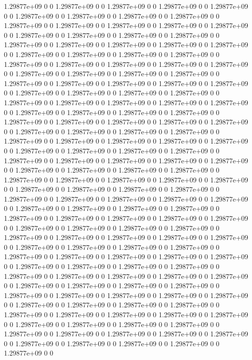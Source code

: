 1.29877e+09 0 0
1.29877e+09 0 0
1.29877e+09 0 0
1.29877e+09 0 0
1.29877e+09 0 0
1.29877e+09 0 0
1.29877e+09 0 0
1.29877e+09 0 0
1.29877e+09 0 0
1.29877e+09 0 0
1.29877e+09 0 0
1.29877e+09 0 0
1.29877e+09 0 0
1.29877e+09 0 0
1.29877e+09 0 0
1.29877e+09 0 0
1.29877e+09 0 0
1.29877e+09 0 0
1.29877e+09 0 0
1.29877e+09 0 0
1.29877e+09 0 0
1.29877e+09 0 0
1.29877e+09 0 0
1.29877e+09 0 0
1.29877e+09 0 0
1.29877e+09 0 0
1.29877e+09 0 0
1.29877e+09 0 0
1.29877e+09 0 0
1.29877e+09 0 0
1.29877e+09 0 0
1.29877e+09 0 0
1.29877e+09 0 0
1.29877e+09 0 0
1.29877e+09 0 0
1.29877e+09 0 0
1.29877e+09 0 0
1.29877e+09 0 0
1.29877e+09 0 0
1.29877e+09 0 0
1.29877e+09 0 0
1.29877e+09 0 0
1.29877e+09 0 0
1.29877e+09 0 0
1.29877e+09 0 0
1.29877e+09 0 0
1.29877e+09 0 0
1.29877e+09 0 0
1.29877e+09 0 0
1.29877e+09 0 0
1.29877e+09 0 0
1.29877e+09 0 0
1.29877e+09 0 0
1.29877e+09 0 0
1.29877e+09 0 0
1.29877e+09 0 0
1.29877e+09 0 0
1.29877e+09 0 0
1.29877e+09 0 0
1.29877e+09 0 0
1.29877e+09 0 0
1.29877e+09 0 0
1.29877e+09 0 0
1.29877e+09 0 0
1.29877e+09 0 0
1.29877e+09 0 0
1.29877e+09 0 0
1.29877e+09 0 0
1.29877e+09 0 0
1.29877e+09 0 0
1.29877e+09 0 0
1.29877e+09 0 0
1.29877e+09 0 0
1.29877e+09 0 0
1.29877e+09 0 0
1.29877e+09 0 0
1.29877e+09 0 0
1.29877e+09 0 0
1.29877e+09 0 0
1.29877e+09 0 0
1.29877e+09 0 0
1.29877e+09 0 0
1.29877e+09 0 0
1.29877e+09 0 0
1.29877e+09 0 0
1.29877e+09 0 0
1.29877e+09 0 0
1.29877e+09 0 0
1.29877e+09 0 0
1.29877e+09 0 0
1.29877e+09 0 0
1.29877e+09 0 0
1.29877e+09 0 0
1.29877e+09 0 0
1.29877e+09 0 0
1.29877e+09 0 0
1.29877e+09 0 0
1.29877e+09 0 0
1.29877e+09 0 0
1.29877e+09 0 0
1.29877e+09 0 0
1.29877e+09 0 0
1.29877e+09 0 0
1.29877e+09 0 0
1.29877e+09 0 0
1.29877e+09 0 0
1.29877e+09 0 0
1.29877e+09 0 0
1.29877e+09 0 0
1.29877e+09 0 0
1.29877e+09 0 0
1.29877e+09 0 0
1.29877e+09 0 0
1.29877e+09 0 0
1.29877e+09 0 0
1.29877e+09 0 0
1.29877e+09 0 0
1.29877e+09 0 0
1.29877e+09 0 0
1.29877e+09 0 0
1.29877e+09 0 0
1.29877e+09 0 0
1.29877e+09 0 0
1.29877e+09 0 0
1.29877e+09 0 0
1.29877e+09 0 0
1.29877e+09 0 0
1.29877e+09 0 0
1.29877e+09 0 0
1.29877e+09 0 0
1.29877e+09 0 0
1.29877e+09 0 0
1.29877e+09 0 0
1.29877e+09 0 0
1.29877e+09 0 0
1.29877e+09 0 0
1.29877e+09 0 0
1.29877e+09 0 0
1.29877e+09 0 0
1.29877e+09 0 0
1.29877e+09 0 0
1.29877e+09 0 0
1.29877e+09 0 0
1.29877e+09 0 0
1.29877e+09 0 0
1.29877e+09 0 0
1.29877e+09 0 0
1.29877e+09 0 0
1.29877e+09 0 0
1.29877e+09 0 0
1.29877e+09 0 0
1.29877e+09 0 0
1.29877e+09 0 0
1.29877e+09 0 0
1.29877e+09 0 0
1.29877e+09 0 0
1.29877e+09 0 0
1.29877e+09 0 0
1.29877e+09 0 0
1.29877e+09 0 0
1.29877e+09 0 0
1.29877e+09 0 0
1.29877e+09 0 0
